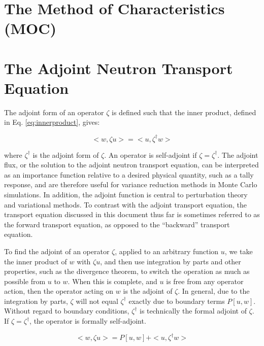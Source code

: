 \documentclass[10pt]{article}
\begin{document}
\begin{flushleft}
\section{The Method of Characteristics (MOC)}








\section{The Adjoint Neutron Transport Equation}

The adjoint form of an operator \(\zeta\) is defined such that the inner product, defined in Eq. \ref{eq:innerproduct}, gives:

\begin{equation}
\label{eq:AdjointDefinition}
<w, \zeta u> = <u, \zeta^\dagger w>
\end{equation}

where \(\zeta^\dagger\) is the adjoint form of \(\zeta\). An operator is self-adjoint if \(\zeta=\zeta^\dagger\). The adjoint flux, or the solution to the adjoint neutron transport equation, can be interpreted as an importance function relative to a desired physical quantity, such as a tally response, and are therefore useful for variance reduction methods in Monte Carlo simulations. In addition, the adjoint function is central to perturbation theory and variational methods. To contrast with the adjoint transport equation, the transport equation discussed in this document thus far is sometimes referred to as the forward transport equation, as opposed to the ``backward'' transport equation. 

To find the adjoint of an operator \(\zeta\), applied to an arbitrary function \(u\), we take the inner product of \(w\) with \(\zeta u\), and then use integration by parts and other properties, such as the divergence theorem, to switch the operation as much as possible from \(u\) to \(w\). When this is complete, and \(u\) is free from any operator action, then the operator acting on \(w\) is the adjoint of \(\zeta\). In general, due to the integration by parts, \(\zeta\) will not equal \(\zeta^\dagger\) exactly due to boundary terms \(P[u,w]\). Without regard to boundary conditions, \(\zeta^\dagger\) is technically the formal adjoint of \(\zeta\). If \(\zeta=\zeta^\dagger\), the operator is formally self-adjoint.

\begin{equation}
\label{eq:FormalAdjointDefinition}
<w, \zeta u> = P[u,w] + <u, \zeta^\dagger w>
\end{equation}


\end{flushleft}
\end{document}
